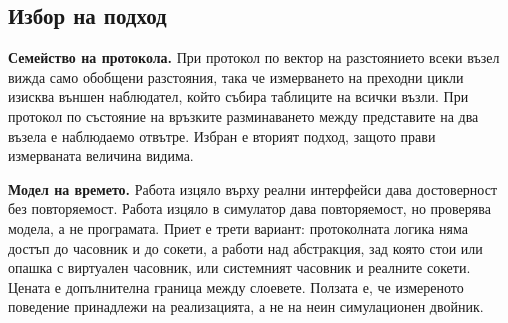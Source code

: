 \subsection{Избор на подход}

\textbf{Семейство на протокола.} При протокол по вектор на разстоянието всеки възел вижда само
обобщени разстояния, така че измерването на преходни цикли изисква външен наблюдател, който
събира таблиците на всички възли. При протокол по състояние на връзките разминаването между
представите на два възела е наблюдаемо отвътре. Избран е вторият подход, защото прави
измерваната величина видима.

\textbf{Модел на времето.} Работа изцяло върху реални интерфейси дава достоверност без
повторяемост. Работа изцяло в симулатор дава повторяемост, но проверява модела, а не
програмата. Приет е трети вариант: протоколната логика няма достъп до часовник и до сокети, а
работи над абстракция, зад която стои или опашка с виртуален часовник, или системният часовник
и реалните сокети. Цената е допълнителна граница между слоевете. Ползата е, че измереното
поведение принадлежи на реализацията, а не на неин симулационен двойник.
